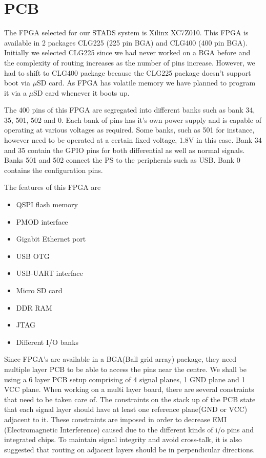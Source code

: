 \documentclass[../../main.tex]{subfiles}
\begin{document}
\section{PCB}
\thispagestyle{fancy}

The FPGA selected for our STADS system is Xilinx XC7Z010. This FPGA is available in 2 packages CLG225 (225 pin BGA) and CLG400 (400 pin BGA). Initially we selected CLG225 since we had never worked on a BGA before and the complexity of routing increases as the number of pins increase. However, we had to shift to CLG400 package because the CLG225 package doesn't support boot via $\mu$SD card.  As FPGA has volatile memory we have planned to program it via a $\mu$SD card whenever it boots up.

The 400 pins of this FPGA are segregated into different banks such as bank 34, 35, 501, 502 and 0. Each bank of pins has it's own power supply and is capable of operating at various voltages as required. Some banks, such as 501 for instance, however need to be operated at a certain fixed voltage, 1.8V in this case. Bank 34 and 35 contain the GPIO pins for both differential as well as normal signals. Banks 501 and 502 connect the PS to the peripherals such as USB. Bank 0 contains the configuration pins.

The features of this FPGA are
\begin{itemize}
    \item {QSPI flash memory }
    \item {PMOD interface}
    \item {Gigabit Ethernet port}
    \item {USB OTG}
    \item {USB-UART interface}
    \item {Micro SD card}
    \item {DDR RAM}
    \item {JTAG}
    \item {Different I/O banks}
\end{itemize}

Since FPGA's are available in a BGA(Ball grid array) package, they need multiple layer PCB to be able to access the pins near the centre. We shall be using a 6 layer PCB setup comprising of 4 signal planes, 1 GND plane and 1 VCC plane. When working on a multi layer board, there are several constraints that need to be taken care of. The constraints on the stack up of the PCB state that each signal layer should have at least one reference plane(GND or VCC) adjacent to it. These constraints are imposed in order to decrease EMI (Electromagnetic Interference) caused due to the different kinds of i/o pins and integrated chips. To maintain signal integrity and avoid cross-talk, it is also suggested that routing on adjacent layers should be in perpendicular directions.
\end{document}
